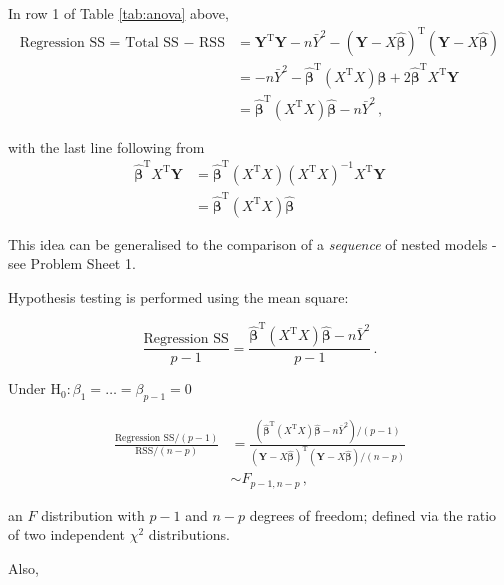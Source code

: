 \documentclass[
]{book}
\theoremstyle{definition}
\theoremstyle{definition}
\theoremstyle{definition}
\theoremstyle{definition}
\theoremstyle{remark}
\begin{document}
In row 1 of Table \ref{tab:anova} above,
\begin{align}
\textrm{Regression SS = Total SS $-$ RSS} & = \boldsymbol{Y}^{\textrm{T}}\boldsymbol{Y} - n\bar{Y}^{2} - (\boldsymbol{Y}-X\hat{\boldsymbol{\beta}})^{\textrm{T}}(\boldsymbol{Y}-X\hat{\boldsymbol{\beta}})\\
& = -n\bar{Y}^{2}-\hat{\boldsymbol{\beta}}^{\textrm{T}}(X^{\textrm{T}}X)\hat{\boldsymbol{\beta}}+2\hat{\boldsymbol{\beta}}^{\textrm{T}}X^{\textrm{T}}\boldsymbol{Y} \\
& = \hat{\boldsymbol{\beta}}^{\textrm{T}}(X^{\textrm{T}}X)\hat{\boldsymbol{\beta}}-n\bar{Y}^{2}\,,
\label{eq:SSS}
\end{align}

with the last line following from
\begin{align*}
\hat{\boldsymbol{\beta}}^{\textrm{T}}X^{\textrm{T}}\boldsymbol{Y} & =
\hat{\boldsymbol{\beta}}^{\textrm{T}}(X^{\textrm{T}}X)(X^{\textrm{T}}X)^{-1}X^{\textrm{T}}\boldsymbol{Y} \\
& = \hat{\boldsymbol{\beta}}^{\textrm{T}}(X^{\textrm{T}}X)\hat{\boldsymbol{\beta}}
\end{align*}

This idea can be generalised to the comparison of a \emph{sequence} of nested models - see Problem Sheet 1.

Hypothesis testing is performed using the mean square:

\begin{equation}
\frac{\textrm{Regression SS}}{p-1}=\frac{\hat{\boldsymbol{\beta}}^{\textrm{T}}(X^{\textrm{T}}X)\hat{\boldsymbol{\beta}}-n\bar{Y}^{2}}{p-1}\,.\nonumber
\end{equation}

Under \(\textrm{H}_{0}: \beta_{1}=\dots=\beta_{p-1}=0\)

\begin{align*}
\frac{\textrm{Regression SS}/(p-1)}{\textrm{RSS}/(n-p)} & = \frac{(\hat{\boldsymbol{\beta}}^{\textrm{T}}(X^{\textrm{T}}X)\hat{\boldsymbol{\beta}} - n\bar{Y}^{2})/(p-1)}{(\boldsymbol{Y}-X\hat{\boldsymbol{\beta}})^{\textrm{T}}(\boldsymbol{Y}-X\hat{\boldsymbol{\beta}})/(n-p)}\nonumber\\
& \sim F_{p-1,n-p}\,,
\end{align*}

an \(F\) distribution with \(p-1\) and \(n-p\) degrees of freedom; defined via the ratio of two independent \(\chi^{2}\) distributions.

Also,
\end{document}
